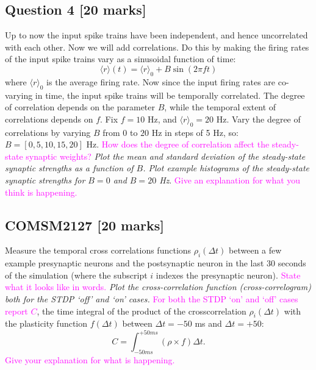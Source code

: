\documentclass[12pt]{article}
\begin{document}
\subsection*{Question 4 [20 marks]} Up to now the input spike trains have been independent,
and hence uncorrelated with each other. Now we will add correlations.
Do this by making the firing rates of the input spike trains vary
as a sinusoidal function of time:
\[
\langle r\rangle(t)=\langle r\rangle_{0}+B\sin(2\pi ft)
\]
where $\langle r\rangle_{0}$ is the average firing rate. Now since
the input firing rates are co-varying in time, the input spike trains
will be temporally correlated. The degree of correlation depends on
the parameter $B$, while the temporal extent of correlations depends
on $f$. Fix $f=10$ Hz, and $\langle r\rangle_{0}=20$ Hz. Vary the
degree of correlations by varying $B$ from $0$ to $20$ Hz in steps of 5 Hz, so: $B=[0, 5, 10, 15, 20]$ Hz. \textcolor{magenta}{How
does the degree of correlation affect the steady-state synaptic weights?}
\emph{Plot the mean and standard deviation of the steady-state synaptic
strengths as a function of $B$. Plot example histograms of the steady-state
synaptic strengths for $B=0$ and $B=20$ Hz}. \textcolor{magenta}{Give an explanation for what you think is
happening.}

\subsection*{COMSM2127 [20 marks]} Measure the temporal cross correlations functions
$\rho_{i}(\Delta t)$ between a few example presynaptic neurons and
the postsynaptic neuron in the last 30 seconds of the simulation (where the subscript $i$ indexes the presynaptic
neuron). \textcolor{magenta}{State what it looks like in words.} \emph{Plot the
cross-correlation function (cross-correlogram) both for the STDP `off'
and `on' cases.} \textcolor{magenta} {For both the STDP `on' and `off' cases report $C$}, the time integral of
the product of the crosscorrelation $\rho_i(\Delta t)$ with the plasticity function $f(\Delta t)$ between $\Delta t=-50$ ms and $\Delta t=+50$:
\[
C = \int_{-50 ms}^{+50 ms} (\rho \times f) \Delta t.
\] \textcolor{magenta} {Give your explanation for what is
happening.}

\end{document}
